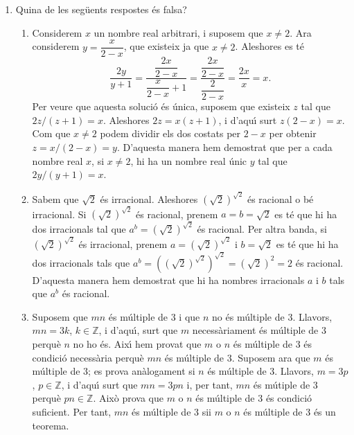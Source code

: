 \begin{enumerate}
\item Quina de les seg\"{u}ents respostes \'{e}s falsa?

\begin{enumerate}
\item Considerem $x$ un nombre real arbitrari, i suposem que $x\neq2$. Ara
considerem $y=\dfrac{x}{2-x}$, que existeix ja que $x\neq2$. Aleshores es
t\'{e}%
\[
\frac{2y}{y+1}=\frac{\dfrac{2x}{2-x}}{\dfrac{x}{2-x}+1}=\frac{\dfrac{2x}{2-x}%
}{\dfrac{2}{2-x}}=\frac{2x}{x}=x\text{.}%
\]
Per veure que aquesta soluci\'{o} \'{e}s \'{u}nica, suposem que existeix $z$
tal que $2z/(z+1)=x$. Aleshores $2z=x\left(  z+1\right)  $, i d'aqu\'{\i} surt
$z\left(  2-x\right)  =x$. Com que $x\neq2$ podem dividir els dos costats per
$2-x$ per obtenir $z=x/\left(  2-x\right)  =y$. D'aquesta manera hem demostrat
que per a cada nombre real $x$, si $x\neq2$, hi ha un nombre real \'{u}nic $y$
tal que $2y/\left(  y+1\right)  =x$.

\item Sabem que $\sqrt{2}$ \'{e}s irracional. Aleshores $\left(  \sqrt
{2}\right)  ^{\sqrt{2}}$ \'{e}s racional o b\'{e} irracional. Si $\left(
\sqrt{2}\right)  ^{\sqrt{2}}$ \'{e}s racional, prenem $a=b=\sqrt{2}$ es t\'{e}
que hi ha dos irracionals tal que $a^{b}=\left(  \sqrt{2}\right)  ^{\sqrt{2}}$
\'{e}s racional. Per altra banda, si $\left(  \sqrt{2}\right)  ^{\sqrt{2}}$
\'{e}s irracional, prenem $a=\left(  \sqrt{2}\right)  ^{\sqrt{2}}$ i
$b=\sqrt{2}$ es t\'{e} que hi ha dos irracionals tals que $a^{b}=\left(
\left(  \sqrt{2}\right)  ^{\sqrt{2}}\right)  ^{\sqrt{2}}=\left(  \sqrt
{2}\right)  ^{2}=2$ \'{e}s racional. D'aquesta manera hem demostrat que hi ha
nombres irracionals $a$ i $b$ tals que $a^{b}$ \'{e}s racional.

\item Suposem que $mn$ \'{e}s m\'{u}ltiple de 3 i que $n$ no \'{e}s
m\'{u}ltiple de 3. Llavors, $mn=3k$, $k\in\mathbb{Z}$, i d'aqu\'{\i}, surt que
$m$ necess\`{a}riament \'{e}s m\'{u}ltiple de 3 perqu\`{e} $n$ no ho \'{e}s.
Aix\'{\i} hem provat que $m$ o $n$ \'{e}s m\'{u}ltiple de 3 \'{e}s
condici\'{o} necess\`{a}ria perqu\`{e} $mn$ \'{e}s m\'{u}ltiple de 3. Suposem
ara que $m$ \'{e}s m\'{u}ltiple de 3; es prova an\`{a}logament si $n$ \'{e}s
m\'{u}ltiple de 3. Llavors, $m=3p$, $p\in\mathbb{Z}$, i d'aqu\'{\i} surt que
$mn=3pn$ i, per tant, $mn$ \'{e}s m\'{u}tiple de 3 perqu\`{e} $pn\in
\mathbb{Z}$. Aix\`{o} prova que $m$ o $n$ \'{e}s m\'{u}ltiple de 3 \'{e}s
condici\'{o} suficient. Per tant, $mn$ \'{e}s m\'{u}ltiple de 3 sii $m$ o $n$
\'{e}s m\'{u}ltiple de 3 \'{e}s un teorema.


\end{enumerate}
\end{enumerate}
